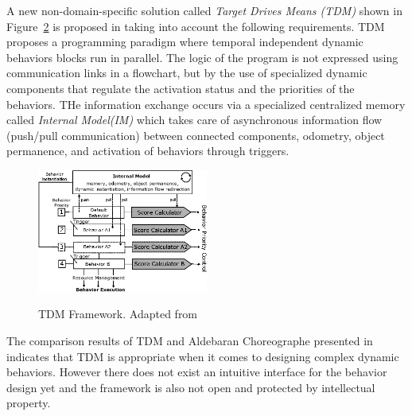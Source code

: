{\begin{figure}[H]
\label{fig:visprog}
\end{figure}
A new non-domain-specific solution called \emph{Target Drives Means (TDM)} shown in Figure~\ref{fig:tdm_im} is proposed in \cite{berenz2014targets} taking into account the following requirements. TDM proposes a programming paradigm where temporal independent dynamic behaviors blocks run in parallel. The logic of the program is not expressed using communication links in a flowchart, but by the use of specialized dynamic components that regulate the activation status and the priorities of the behaviors. THe information exchange occurs via a specialized centralized memory called \emph{Internal Model(IM)} which takes care of asynchronous information flow (push/pull communication) between connected components, odometry, object permanence, and activation of behaviors through triggers. 
\begin{figure}[H]
\centering
\includegraphics[width=0.5\textwidth]{assets/tdm_im.eps}
\label{fig:tdm_im}
\caption[Target-drives-means Framework]{TDM Framework. {Adapted from \cite{berenz2014targets}}}
\end{figure}
The comparison results of TDM and Aldebaran Choreographe presented in \cite{berenz2014targets} indicates that TDM is appropriate when it comes to designing complex dynamic behaviors. However there does not exist an intuitive interface for the behavior design yet and the framework is also not open and protected by intellectual property.

}
